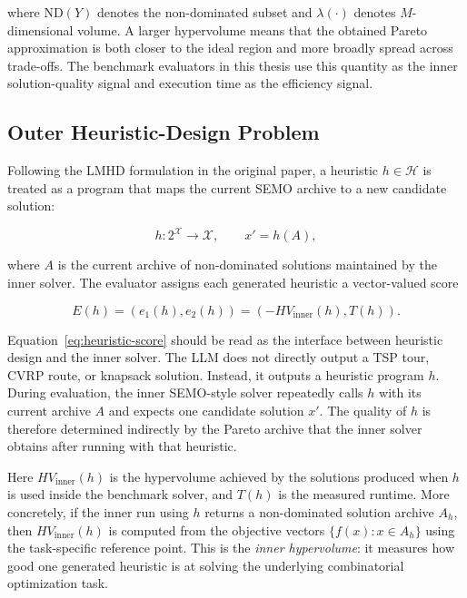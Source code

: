 \documentclass[../main.tex]{subfiles}
\begin{document}
where $\mathrm{ND}(Y)$ denotes the non-dominated subset and $\lambda(\cdot)$ denotes $M$-dimensional volume. A larger hypervolume means that the obtained Pareto approximation is both closer to the ideal region and more broadly spread across trade-offs. The benchmark evaluators in this thesis use this quantity as the inner solution-quality signal and execution time as the efficiency signal.

\subsection{Outer Heuristic-Design Problem}

Following the LMHD formulation in the original \mpage{} paper, a heuristic $h \in \mathcal{H}$ is treated as a program that maps the current SEMO archive to a new candidate solution:

\begin{equation}
  h : 2^{\mathcal{X}} \rightarrow \mathcal{X}, \qquad x' = h(A),
\end{equation}

where $A$ is the current archive of non-dominated solutions maintained by the inner solver. The evaluator assigns each generated heuristic a vector-valued score

\begin{equation}
  E(h) = \left(e_1(h), e_2(h)\right)
       = \left(-HV_{\text{inner}}(h), T(h)\right).
  \label{eq:heuristic-score}
\end{equation}

Equation~\ref{eq:heuristic-score} should be read as the interface between heuristic design and the inner solver. The LLM does not directly output a TSP tour, CVRP route, or knapsack solution. Instead, it outputs a heuristic program $h$. During evaluation, the inner SEMO-style solver repeatedly calls $h$ with its current archive $A$ and expects one candidate solution $x'$. The quality of $h$ is therefore determined indirectly by the Pareto archive that the inner solver obtains after running with that heuristic.

Here $HV_{\text{inner}}(h)$ is the hypervolume achieved by the solutions produced when $h$ is used inside the benchmark solver, and $T(h)$ is the measured runtime. More concretely, if the inner run using $h$ returns a non-dominated solution archive $A_h$, then $HV_{\text{inner}}(h)$ is computed from the objective vectors $\{f(x):x\in A_h\}$ using the task-specific reference point. This is the \emph{inner hypervolume}: it measures how good one generated heuristic is at solving the underlying combinatorial optimization task.
\end{document}
